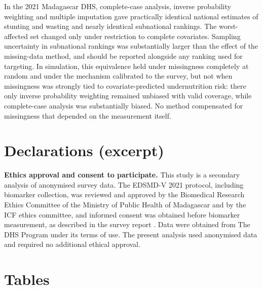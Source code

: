 \documentclass[11pt,a4paper]{article}
\begin{document}
In the 2021 Madagascar DHS, complete-case analysis, inverse probability
weighting and multiple imputation gave practically identical national
estimates of stunting and wasting and nearly identical subnational
rankings. The worst-affected set changed only under restriction to
complete covariates. Sampling uncertainty in subnational rankings was
substantially larger than the effect of the missing-data method, and
should be reported alongside any ranking used for targeting. In
simulation, this equivalence held under missingness completely at random
and under the mechanism calibrated to the survey, but not when
missingness was strongly tied to covariate-predicted undernutrition
risk: there only inverse probability weighting remained unbiased with
valid coverage, while complete-case analysis was substantially biased.
No method compensated for missingness that depended on the measurement
itself.

\section{Declarations (excerpt)}\label{declarations-excerpt}

\textbf{Ethics approval and consent to participate.} This study is a
secondary analysis of anonymised survey data. The EDSMD-V 2021 protocol,
including biomarker collection, was reviewed and approved by the
Biomedical Research Ethics Committee of the Ministry of Public Health of
Madagascar and by the ICF ethics committee, and informed consent was
obtained before biomarker measurement, as described in the survey report
\cite{instat2022edsmd}. Data were obtained from The DHS Program under
its terms of use. The present analysis used anonymised data and required
no additional ethical approval.

\clearpage



\clearpage
\section*{Tables}
\end{document}
